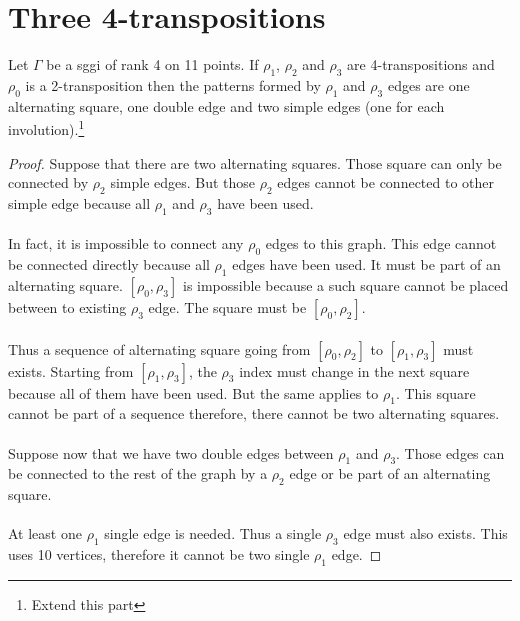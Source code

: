 \section{Three 4-transpositions}

\begin{lemma}
  Let $\Gamma$ be a sggi of rank 4 on 11 points. If $\rho_1$, $\rho_2$ and $\rho_3$ are 4-transpositions and $\rho_0$ is a 2-transposition then the patterns formed by $\rho_1$ and $\rho_3$ edges are one alternating square, one double edge and two simple edges (one for each involution).\footnote{Extend this part}
\end{lemma}

\begin{proof}
  Suppose that there are two alternating squares. Those square can only be connected by $\rho_2$ simple edges. But those $\rho_2$ edges cannot be connected to other simple edge because all $\rho_1$ and $\rho_3$ have been used.

  \paragraph{}
  In fact, it is impossible to connect any $\rho_0$ edges to this graph. This edge cannot be connected directly because all $\rho_1$ edges have been used. It must be part of an alternating square. $[\rho_0, \rho_3]$ is impossible because a such square cannot be placed between to existing $\rho_3$ edge. The square must be $[\rho_0, \rho_2]$.

  \paragraph{}
  Thus a sequence of alternating square going from $[\rho_0, \rho_2]$ to $[\rho_1, \rho_3]$ must exists. Starting from $[\rho_1, \rho_3]$, the $\rho_3$ index must change in the next square because all of them have been used. But the same applies to $\rho_1$. This square cannot be part of a sequence therefore, there cannot be two alternating squares.

  \paragraph{}
  Suppose now that we have two double edges between $\rho_1$ and $\rho_3$. Those edges can be connected to the rest of the graph by a $\rho_2$ edge or be part of an alternating square.

  \paragraph{}
  At least one $\rho_1$ single edge is needed. Thus a single $\rho_3$ edge must also exists. This uses 10 vertices, therefore it cannot be two single $\rho_1$ edge.


\end{proof}
